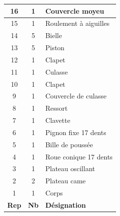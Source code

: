 \documentclass[11pt,oneside]{article}
\begin{document}
\begin{minipage}[c]{.46\linewidth}
\begin{center}
\begin{tabular}{|c|c|p{6cm}|}
\hline 
16 &1 &Couvercle moyeu \\ \hline
15 &1 &Roulement à aiguilles \\ \hline
14 &5 &Bielle \\ \hline
13 &5 &Piston \\ \hline
12 &1 &Clapet \\ \hline
11 &1 &Culasse \\ \hline
10& 1 &Clapet \\ \hline
9 &1 &Couvercle de culasse \\ \hline
8 &1 &Ressort \\ \hline
7 &1 &Clavette \\ \hline
6 &1 &Pignon fixe 17 dents \\ \hline
5& 1 & Bille de poussée \\ \hline
4& 1 &Roue conique 17 dents \\ \hline
3& 1 &Plateau oscillant \\ \hline
2& 2 &Plateau came \\ \hline
1& 1 &Corps \\ \hline
\textbf{Rep} & \textbf{Nb} & \textbf{Désignation} \\ \hline
\end{tabular}
\end{center}

\end{minipage}
\end{document}
